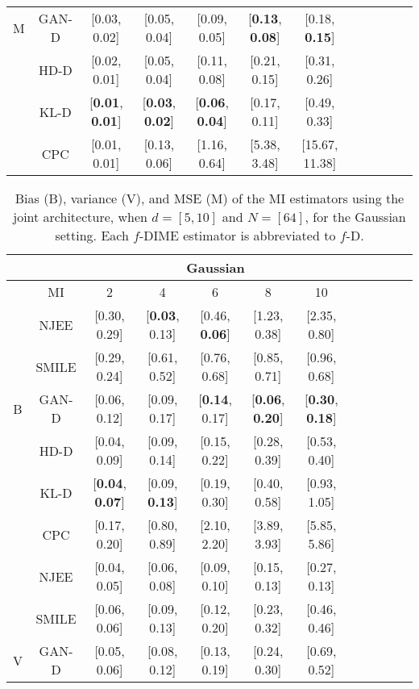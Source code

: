 \begin{table}
\begin{tabular}{ |c|c|c c c c c|c c c c c| }
      M & GAN-D & [0.03, 0.02] & [0.05, 0.04] & [0.09, 0.05] & [\textbf{0.13}, \textbf{0.08}] & [0.18, \textbf{0.15}]  \\
      & HD-D & [0.02, 0.01] & [0.05, 0.04] & [0.11, 0.08] & [0.21, 0.15] & [0.31, 0.26] \\
      & KL-D & [\textbf{0.01}, \textbf{0.01}] & [\textbf{0.03}, \textbf{0.02}] & [\textbf{0.06}, \textbf{0.04}] & [0.17, 0.11] & [0.49, 0.33]  \\
      & CPC & [0.01, 0.01] & [0.13, 0.06] & [1.16, 0.64] & [5.38, 3.48] & [15.67, 11.38]  \\
     \hline
    \end{tabular}
    \label{tab:MI_bias_var_mse_gauss_N_varying}
\end{table}

\begin{table}
\caption{Bias (B), variance (V), and MSE (M) of the MI estimators using the joint architecture, when $d=[5, 10]$ and $N=[64]$, for the Gaussian setting. Each $f$-DIME estimator is abbreviated to $f$-D.} 
\setlength{\arrayrulewidth}{0.5mm}
\centering
    \begin{tabular}{ |c|c|c c c c c|c c c c c| } 
     \hline
     & & \multicolumn{5}{|c|}{Gaussian} \\
     \hline
     & MI & 2 & 4 & 6 & 8 & 10 \\
     \hline
      & NJEE & [0.30, 0.29] & [\textbf{0.03}, 0.13] & [0.46, \textbf{0.06}] & [1.23, 0.38] & [2.35, 0.80] \\
      & SMILE & [0.29, 0.24] & [0.61, 0.52] & [0.76, 0.68] & [0.85, 0.71] & [0.96, 0.68]\\
      B & GAN-D & [0.06, 0.12] & [0.09, 0.17] & [\textbf{0.14}, 0.17] & [\textbf{0.06}, \textbf{0.20}] & [\textbf{0.30}, \textbf{0.18}] \\
      & HD-D & [0.04, 0.09] & [0.09, 0.14] & [0.15, 0.22] & [0.28, 0.39] & [0.53, 0.40]  \\
      & KL-D & [\textbf{0.04}, \textbf{0.07}] & [0.09, \textbf{0.13}] & [0.19, 0.30] & [0.40, 0.58] & [0.93, 1.05]  \\
      & CPC & [0.17, 0.20] & [0.80, 0.89] & [2.10, 2.20] & [3.89, 3.93] & [5.85, 5.86]  \\
     \hline
     & NJEE & [0.04, 0.05] & [0.06, 0.08] & [0.09, 0.10] & [0.15, 0.13] & [0.27, 0.13] \\
      & SMILE & [0.06, 0.06] & [0.09, 0.13] & [0.12, 0.20] & [0.23, 0.32] & [0.46, 0.46]  \\
      V & GAN-D & [0.05, 0.06] & [0.08, 0.12] & [0.13, 0.19] & [0.24, 0.30] & [0.69, 0.52] \\

\end{tabular}
\end{table}
